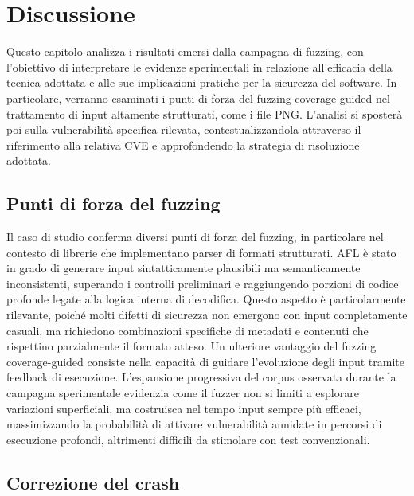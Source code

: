 \chapter{Discussione}
Questo capitolo analizza i risultati emersi dalla campagna di fuzzing, con l’obiettivo di interpretare le evidenze sperimentali in relazione all’efficacia della tecnica adottata e alle sue implicazioni pratiche per la sicurezza del software.
In particolare, verranno esaminati i punti di forza del fuzzing coverage-guided nel trattamento di input altamente strutturati, come i file PNG. L'analisi si sposterà poi sulla vulnerabilità specifica rilevata, contestualizzandola attraverso il riferimento alla relativa CVE e approfondendo la strategia di risoluzione adottata.


\section{Punti di forza del fuzzing}
Il caso di studio conferma diversi punti di forza del fuzzing, in particolare nel contesto di librerie che implementano parser di formati strutturati. 
AFL è stato in grado di generare input sintatticamente plausibili ma semanticamente inconsistenti, superando i controlli preliminari e raggiungendo porzioni di codice profonde legate alla logica interna di decodifica. 
Questo aspetto è particolarmente rilevante, poiché molti difetti di sicurezza non emergono con input completamente casuali, ma richiedono combinazioni specifiche di metadati e contenuti che rispettino parzialmente il formato atteso.
Un ulteriore vantaggio del fuzzing coverage-guided consiste nella capacità di guidare l’evoluzione degli input tramite feedback di esecuzione. 
L’espansione progressiva del corpus osservata durante la campagna sperimentale evidenzia come il fuzzer non si limiti a esplorare variazioni superficiali, ma costruisca nel tempo input sempre più efficaci, massimizzando la probabilità di attivare vulnerabilità annidate in percorsi di esecuzione profondi, altrimenti difficili da stimolare con test convenzionali.


\section{Correzione del crash}

